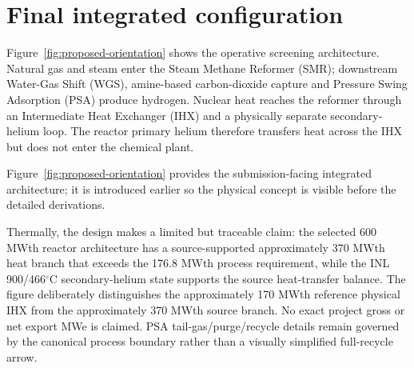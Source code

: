 \section{Final integrated configuration}
Figure~\ref{fig:proposed-orientation} shows the operative screening architecture. Natural gas and steam enter the Steam Methane Reformer (SMR); downstream Water-Gas Shift (WGS), amine-based carbon-dioxide capture and Pressure Swing Adsorption (PSA) produce hydrogen. Nuclear heat reaches the reformer through an Intermediate Heat Exchanger (IHX) and a physically separate secondary-helium loop. The reactor primary helium therefore transfers heat across the IHX but does not enter the chemical plant.

Figure~\ref{fig:proposed-orientation} provides the submission-facing integrated architecture; it is introduced earlier so the physical concept is visible before the detailed derivations.



Thermally, the design makes a limited but traceable claim: the selected 600 MWth reactor architecture has a source-supported approximately 370 MWth heat branch that exceeds the 176.8 MWth process requirement, while the INL 900/466$^\circ$C secondary-helium state supports the source heat-transfer balance. The figure deliberately distinguishes the approximately 170 MWth reference physical IHX from the approximately 370 MWth source branch. No exact project gross or net export MWe is claimed. PSA tail-gas/purge/recycle details remain governed by the canonical process boundary rather than a visually simplified full-recycle arrow.
